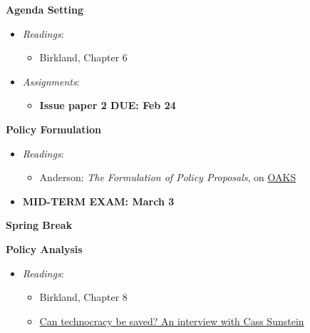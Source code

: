 \week \textbf{Agenda Setting}

\begin{itemize}

\item
  \emph{Readings}:

  \begin{itemize}
  
  \item
    Birkland, Chapter 6
  \end{itemize}
\item
  \emph{Assignments}:

  \begin{itemize}
  
  \item
    \textbf{Issue paper 2 DUE: Feb 24}
  \end{itemize}
\end{itemize}

\week \textbf{Policy Formulation}

\begin{itemize}

\item
  \emph{Readings}:

  \begin{itemize}
  
  \item
    Anderson: \emph{The Formulation of Policy Proposals}, on
    \href{https://lms.cofc.edu/d2l/login}{OAKS}
  \end{itemize}
\item
  \textbf{MID-TERM EXAM: March 3}
\end{itemize}

\week \textbf{Spring Break}

\week \textbf{Policy Analysis}

\begin{itemize}

\item
  \emph{Readings}:

  \begin{itemize}
  
  \item
    Birkland, Chapter 8
  \item
    \href{https://www.vox.com/future-perfect/2018/10/22/18001014/cass-sunstein-cost-benefit-analysis-technocracy-liberalism}{Can
    technocracy be saved? An interview with Cass Sunstein}
  \end{itemize}
\end{itemize}

